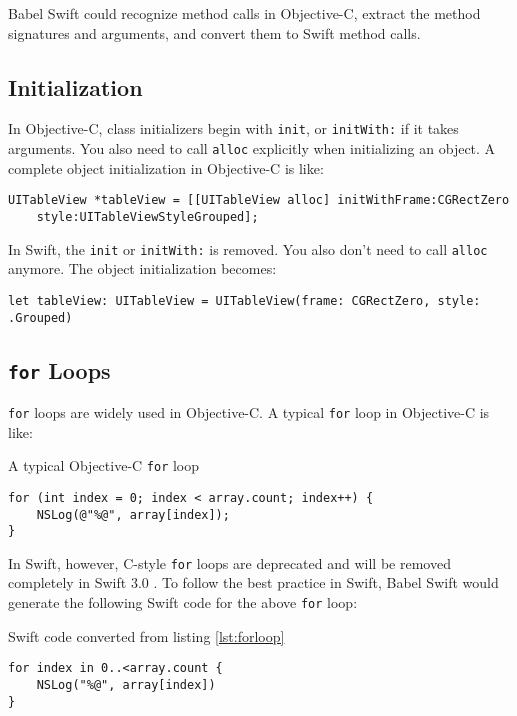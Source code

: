 \documentclass{sfuthesis}
\begin{document}
Babel Swift could recognize method calls in Objective-C, extract the method signatures and arguments, and convert them to Swift method calls.

\subsection{Initialization}

In Objective-C, class initializers begin with \texttt{init}, or \texttt{initWith:} if it takes arguments. You also need to call \texttt{alloc} explicitly when initializing an object. A complete object initialization in Objective-C is like:

\begin{verbatim}
UITableView *tableView = [[UITableView alloc] initWithFrame:CGRectZero
    style:UITableViewStyleGrouped];
\end{verbatim}

In Swift, the \texttt{init} or \texttt{initWith:} is removed. You also don't need to call \texttt{alloc} anymore. The object initialization becomes:

\begin{verbatim}
let tableView: UITableView = UITableView(frame: CGRectZero, style: .Grouped)
\end{verbatim}

\subsection{\texttt{for} Loops}

\texttt{for} loops are widely used in Objective-C. A typical \texttt{for} loop in Objective-C is like:

\begin{listing}[H]
\caption{A typical Objective-C \texttt{for} loop}
\label{lst:forloop}
\begin{verbatim}
for (int index = 0; index < array.count; index++) {
    NSLog(@"%@", array[index]);
}
\end{verbatim}
\end{listing}

In Swift, however, C-style \texttt{for} loops are deprecated and will be removed completely in Swift 3.0 \cite{removecforloops}. To follow the best practice in Swift, Babel Swift would generate the following Swift code for the above \texttt{for} loop:

\begin{listing}[H]
\caption{Swift code converted from listing \ref{lst:forloop}}
\begin{verbatim}
for index in 0..<array.count {
    NSLog("%@", array[index])
}
\end{verbatim}
\end{listing}
\end{document}
